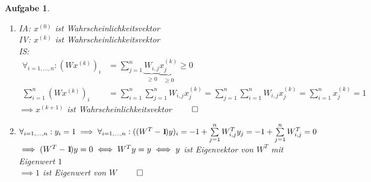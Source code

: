 \documentclass[11pt]{article}
\theoremstyle{break}
\newtheorem{task}{Aufgabe}
\def\1{\ensuremath{{\normalfont\hbox{1\kern-0.18em \vrule width .6pt}}}}
\begin{document}
\begin{task}
    \hfill\vspace{-5mm}
    \begin{enumerate}[label={(\alph*)}]
        \item IA: $x^{(0)}$ ist Wahrscheinlichkeitsvektor\\
        IV: $x^{(k)}$ ist Wahrscheinlichkeitsvektor\\
        IS: 
        \begin{align*}
            \forall_{i=1, \ldots, n}: \left(Wx^{(k)}\right)_i &= \sum\limits_{j=1}^{n} \underbrace{W_{i,j}}_{\geq 0} \underbrace{x^{(k)}_j}_{\geq 0} \geq 0\\
            \sum\limits_{i=1}^n \left(Wx^{(k)}\right)_i &= \sum\limits_{i=1}^n \sum\limits_{j=1}^{n} W_{i,j} x^{(k)}_j = \sum\limits_{j=1}^n \sum\limits_{i=1}^{n} W_{i,j} x^{(k)}_j = \sum\limits_{i=1}^n x^{(k)}_j = 1
        \end{align*}
        $\implies x^{(k+1)}$ ist Wahrscheinlichkeitsvektor $\hfill\qed$

        \item $\forall_{i=1, \ldots, n}: y_i = 1 \implies \forall_{i=1, \ldots, n}: ((W^T - \1)y)_i = -1 + \sum\limits_{j=1}^{n} W^T_{i,j} y_j = -1 + \sum\limits_{j=1}^{n} W^T_{i,j} = 0$\\
        $\implies (W^T - \1)y = 0 \iff W^Ty = y \iff y$ ist Eigenvektor von $W^T$ mit Eigenwert $1$\\
        $\implies 1$ ist Eigenwert von $W$ $\hfill\qed$


\end{enumerate}
\end{task}
\end{document}
